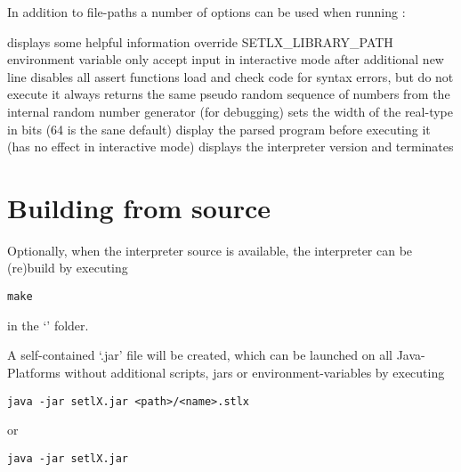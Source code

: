 
In addition to file-paths a number of options can be used when running \setlX{}:

\begin{itemize}
	      {displays some helpful information}
	      {override SETLX\_LIBRARY\_PATH environment variable}
	      {only accept input in interactive mode after additional new line}
	      {disables all assert functions}
	      {load and check code for syntax errors, but do not execute it}
	      {always returns the same pseudo random sequence of numbers from the internal random number generator (for debugging)}
           {sets the width of the real-type in bits (64 is the sane default)}
           {display the parsed program before executing it (has no effect in interactive mode)}
           {displays the interpreter version and terminates}
\end{itemize}

\section{Building from source}

Optionally, when the interpreter source is available, the interpreter can be (re)build by executing

\begin{lstlisting}[frame=none,numbers=none]
make
\end{lstlisting}

in the `' folder.

A self-contained `.jar' file will be created, which can be launched on all Java-Platforms without additional scripts, jars or environment-variables by executing

\begin{lstlisting}[frame=none,numbers=none]
java -jar setlX.jar <path>/<name>.stlx
\end{lstlisting}

or

\begin{lstlisting}[frame=none,numbers=none]
java -jar setlX.jar
\end{lstlisting}

